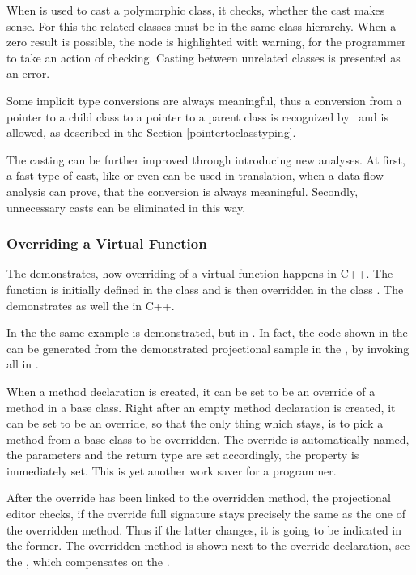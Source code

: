 When  is used to cast a polymorphic class, it checks, whether the cast makes sense.
For this the related classes must be in the same class hierarchy. When a zero result is possible,
the node is highlighted with warning, for the programmer to take an action of checking. Casting 
between unrelated classes is presented as an error.

Some implicit type conversions are always meaningful, thus a conversion from a pointer to 
a child class to a pointer to a parent class is recognized by \pcpp\ and is allowed, as 
described in the Section \ref{pointertoclasstyping}.

The casting can be further improved through introducing new analyses. At first, a fast type of cast, 
like  or even  can be used in translation, when a data-flow analysis
can prove, that the conversion is always meaningful. Secondly, unnecessary casts can be eliminated in this way.


\subsubsection{Overriding a Virtual Function}
\label{overridefunction}

The  demonstrates, how overriding of a virtual function happens in C++.
The function  is initially defined in the class  and is then overridden
in the class . The  demonstrates as well the  in C++.


In the  the same example is demonstrated, but in \pcpp.
In fact, the code shown in the  can be generated 
from the demonstrated projectional sample in the , by invoking all  in \jbmps.

When a method declaration is created, it can be set to be an override of a method in a base class.
Right after an empty method declaration is created, it can be set to be an override, so that the only
thing which stays, is to pick a method from a base class to be overridden. The override is automatically
named, the parameters and the return type are set accordingly, the  property is immediately
set. This is yet another work saver for a programmer.

After the override has been linked to the overridden method, the projectional editor checks, if 
the override full signature stays precisely the same as the one of the overridden method. Thus if the 
latter changes, it is going to be indicated in the former.
The overridden method is shown next to the override declaration, see the , which 
compensates on the .

